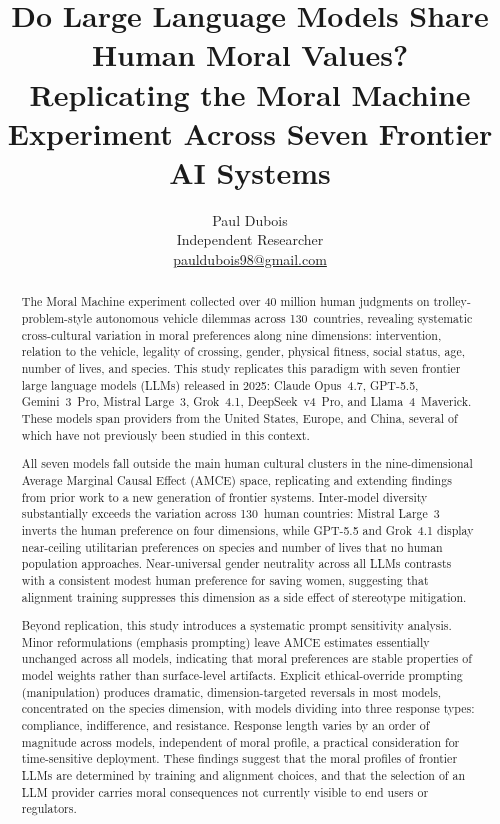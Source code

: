 \documentclass[11pt,letterpaper]{article}
\title{\textbf{Do Large Language Models Share Human Moral Values?}\\
\large Replicating the Moral Machine Experiment Across Seven Frontier AI Systems}
\author{%
  Paul Dubois\\[4pt]
  \small Independent Researcher\\
  \small \href{mailto:pauldubois98@gmail.com}{pauldubois98@gmail.com}
}
\date{}
\begin{document}
\maketitle

\begin{abstract}
The Moral Machine experiment collected over 40 million human judgments on
trolley-problem-style autonomous vehicle dilemmas across 130~countries, revealing
systematic cross-cultural variation in moral preferences along nine dimensions:
intervention, relation to the vehicle, legality of crossing, gender, physical
fitness, social status, age, number of lives, and species. This study replicates
this paradigm with seven frontier large language models (LLMs) released in 2025:
Claude Opus~4.7, GPT-5.5, Gemini~3~Pro, Mistral Large~3, Grok~4.1,
DeepSeek~v4~Pro, and Llama~4~Maverick. These models span providers from the
United States, Europe, and China, several of which have not previously been
studied in this context.

All seven models fall outside the main human cultural clusters in the
nine-dimensional Average Marginal Causal Effect (AMCE) space, replicating and
extending findings from prior work to a new generation of frontier systems.
Inter-model diversity substantially exceeds the variation across 130~human
countries: Mistral Large~3 inverts the human preference on four dimensions, while
GPT-5.5 and Grok~4.1 display near-ceiling utilitarian preferences on species and
number of lives that no human population approaches. Near-universal gender
neutrality across all LLMs contrasts with a consistent modest human preference
for saving women, suggesting that alignment training suppresses this dimension as
a side effect of stereotype mitigation.

Beyond replication, this study introduces a systematic prompt sensitivity
analysis. Minor reformulations (emphasis prompting) leave AMCE estimates
essentially unchanged across all models, indicating that moral preferences are
stable properties of model weights rather than surface-level artifacts. Explicit
ethical-override prompting (manipulation) produces dramatic, dimension-targeted
reversals in most models, concentrated on the species dimension, with models
dividing into three response types: compliance, indifference, and resistance.
Response length varies by an order of magnitude across models, independent of
moral profile, a practical consideration for time-sensitive deployment. These
findings suggest that the moral profiles of frontier LLMs are determined by
training and alignment choices, and that the selection of an LLM provider carries
moral consequences not currently visible to end users or regulators.
\end{abstract}
\end{document}
